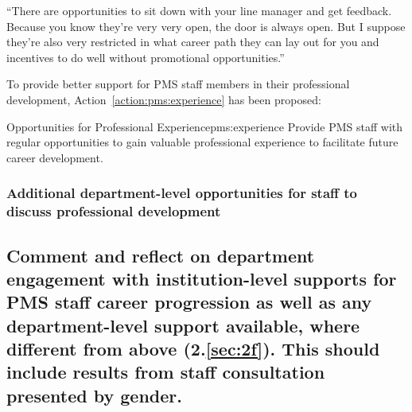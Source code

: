 \begin{myquote}
    ``There are opportunities to sit down with your line manager and get feedback. Because you know they’re very very open, the door is always open. But I suppose they’re also very restricted in what career path they can lay out for you and incentives to do well without promotional opportunities.''
\end{myquote}

To provide better support for PMS staff members 
in their professional development, 
Action~\ref{action:pms:experience} has been proposed: %

\newcommand{\actpmsexperience}{Provide PMS staff with regular opportunities to gain valuable professional experience to facilitate future career development.
}
\begin{actionblock}{\ksspace{}Opportunities for Professional Experience}{pms:experience}
\actpmsexperience
\hfill{
    \hypersetup{hidelinks}
    \hyperlink{d8}{\gotoactionsymbol{}}
}
\end{actionblock}


\subsubsection{Additional department-level opportunities for staff to discuss professional development}


\subsection{Comment and reflect on department engagement with institution-level supports for PMS staff career progression as well as any department-level support available, where different from above (2.\ref{sec:2f}). This should include results from staff consultation presented by gender.}


